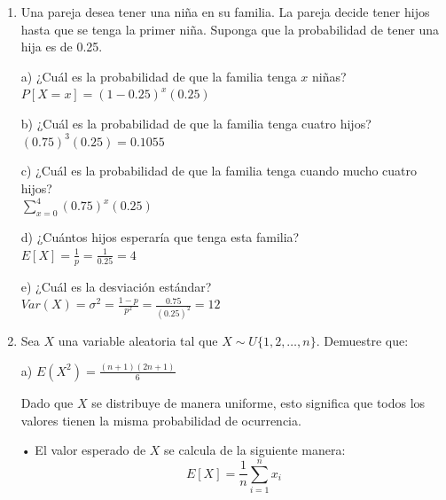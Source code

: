 \documentclass[a4paper, 12pt]{article}
\newcommand{\Pspace}{0.5cm}
\newcommand{\Aspace}{0.2cm}
\begin{document}
\begin{enumerate}
            \vspace{\Pspace}
        \item Una pareja desea tener una niña en su familia. La pareja decide tener hijos hasta que se tenga la primer niña. Suponga que la probabilidad de tener una hija es de 0.25. 
            \vspace{\Aspace} \par
            a) ¿Cuál es la probabilidad de que la familia tenga $x$ niñas?
            \\ { \color{azul} $P[X = x] = (1 - 0{.}25)^{x}(0{.}25)$ }

            \vspace{\Aspace} \par
            b) ¿Cuál es la probabilidad de que la familia tenga cuatro hijos?
            \\ { \color{azul} $(0{.}75)^{3}(0{.}25) = 0{.}1055$ }

            \vspace{\Aspace} \par
            c) ¿Cuál es la probabilidad de que la familia tenga cuando mucho cuatro hijos?
            \\ { \color{azul} $\sum\limits_{x = 0}^{4} (0{.}75)^{x}(0{.}25)$ }

            \vspace{\Aspace} \par
            d) ¿Cuántos hijos esperaría que tenga esta familia?
            \\ { \color{azul} $E[X] = \frac{1}{p} = \frac{1}{0{.}25} = 4$ }

            \vspace{\Aspace} \par
            e) ¿Cuál es la desviación estándar?
            \\ { \color{azul} $Var(X) = \sigma^{2} = \frac{1 - p}{p^{2}} = \frac{0{.}75}{(0{.}25)^{2}} = 12$ }


            \newpage
            \vspace{\Pspace}
        \item Sea $X$ una variable aleatoria tal que $ X \sim U\{1, 2, \dots, n\} $. Demuestre que:
            \vspace{\Aspace} \par
            a) $E(X^{2}) = \frac{(n + 1)(2n + 1)}{6}$
            \\ { \color{azul} 
            Dado que $X$ se distribuye de manera uniforme, esto significa que todos los valores tienen la misma probabilidad de ocurrencia.
            \par • El valor esperado de $X$ se calcula de la siguiente manera:
            \[ E[X] = \frac{1}{n} \sum\limits_{i = 1}^{n} x_{i} \]

}
\end{enumerate}
\end{document}
